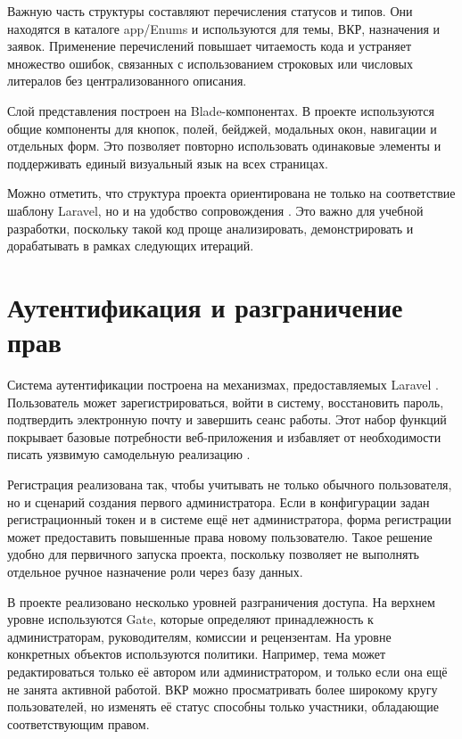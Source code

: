 \documentclass[14pt,a4paper]{extreport}
\begin{document}
Важную часть структуры составляют перечисления статусов и типов.
Они находятся в каталоге app/Enums и используются для темы, ВКР, назначения
и заявок.
Применение перечислений повышает читаемость кода и устраняет множество
ошибок, связанных с использованием строковых или числовых литералов без
централизованного описания.

Слой представления построен на Blade-компонентах.
В проекте используются общие компоненты для кнопок, полей, бейджей,
модальных окон, навигации и отдельных форм.
Это позволяет повторно использовать одинаковые элементы и поддерживать
единый визуальный язык на всех страницах.

Можно отметить, что структура проекта ориентирована не только на соответствие
шаблону Laravel, но и на удобство сопровождения \cite{cleancode}.
Это важно для учебной разработки, поскольку такой код проще анализировать,
демонстрировать и дорабатывать в рамках следующих итераций.

\section{Аутентификация и разграничение прав}

Система аутентификации построена на механизмах, предоставляемых Laravel
\cite{laraveldoc}.
Пользователь может зарегистрироваться, войти в систему, восстановить пароль,
подтвердить электронную почту и завершить сеанс работы.
Этот набор функций покрывает базовые потребности веб-приложения и избавляет
от необходимости писать уязвимую самодельную реализацию \cite{php8}.

Регистрация реализована так, чтобы учитывать не только обычного пользователя,
но и сценарий создания первого администратора.
Если в конфигурации задан регистрационный токен и в системе ещё нет
администратора, форма регистрации может предоставить повышенные права
новому пользователю.
Такое решение удобно для первичного запуска проекта, поскольку позволяет
не выполнять отдельное ручное назначение роли через базу данных.

В проекте реализовано несколько уровней разграничения доступа.
На верхнем уровне используются Gate, которые определяют принадлежность к
администраторам, руководителям, комиссии и рецензентам.
На уровне конкретных объектов используются политики.
Например, тема может редактироваться только её автором или администратором,
и только если она ещё не занята активной работой.
ВКР можно просматривать более широкому кругу пользователей, но изменять её
статус способны только участники, обладающие соответствующим правом.
\end{document}
